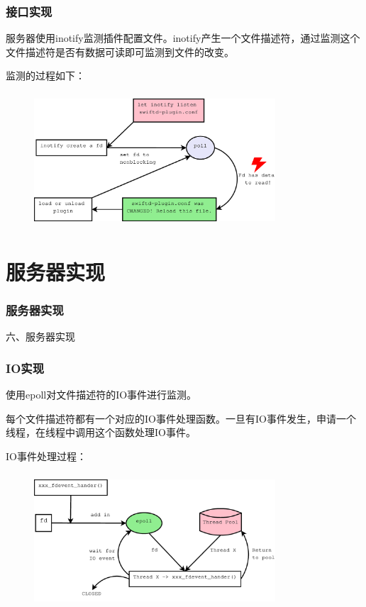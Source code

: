 \documentclass[10pt,dvipdfm]{beamer}
\begin{document}
\begin{frame}
	\frametitle{接口实现}
	服务器使用inotify监测插件配置文件。inotify产生一个文件描述符，通过监测这个文件描述符是否有数据可读即可监测到文件的改变。
	\begin{block}{监测的过程如下：}
	\begin{figure}[htbp]
	\centering
	\includegraphics[height=5cm, width=9cm]{inotify.eps}
	\end{figure}
	\end{block}
\end{frame}

\section{服务器实现}

\begin{frame}
	\frametitle{服务器实现}
	\begin{center}
	{\Large
		六、服务器实现
	}
	\end{center}
\end{frame}

\begin{frame}
	\frametitle{IO实现}
	使用epoll对文件描述符的IO事件进行监测。
	
	
	每个文件描述符都有一个对应的IO事件处理函数。一旦有IO事件发生，申请一个线程，在线程中调用这个函数处理IO事件。
	\pause
	\begin{block}{IO事件处理过程：}
	\begin{figure}[htbp]
	\centering
	\includegraphics[height=5cm, width=9cm]{epoll.eps}
	\end{figure}
	\end{block}
	
\end{frame}
\end{document}
